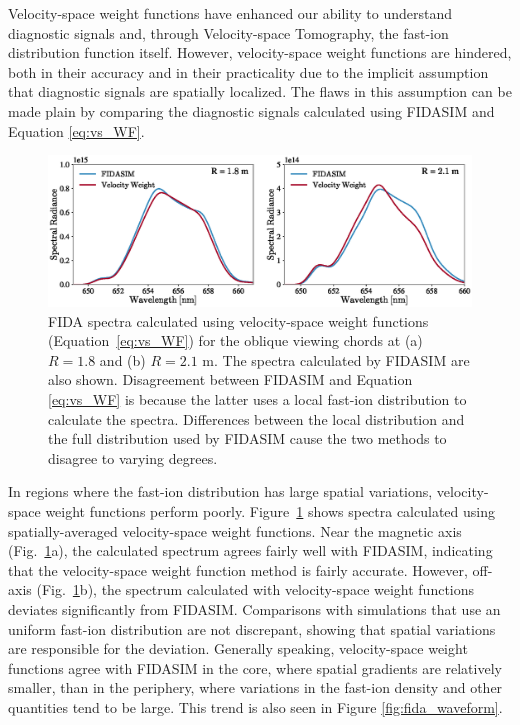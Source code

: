Velocity-space weight functions have enhanced our ability to understand diagnostic signals and, through Velocity-space Tomography, the fast-ion distribution function itself. However, velocity-space weight functions are hindered, both in their accuracy and in their practicality due to the implicit assumption that diagnostic signals are spatially localized. The flaws in this assumption can be made plain by comparing the diagnostic signals calculated using FIDASIM and Equation \ref{eq:vs_WF}.
\begin{figure}[h!]
    \centering
    \includegraphics[width=15cm]{figures/fida_spectra.eps}
    \caption{FIDA spectra calculated using velocity-space weight functions 
(Equation~\ref{eq:vs_WF}) for the oblique viewing chords at
(a) $R = 1.8$ and (b) $R = 2.1$ m.  The spectra calculated by FIDASIM are also shown.
 Disagreement between FIDASIM and Equation \ref{eq:vs_WF} is because the latter uses a local fast-ion distribution to calculate the spectra. Differences between the local distribution and the full distribution used by FIDASIM cause the two methods to disagree to varying degrees.}
    \label{fig:fida_spectra}
\end{figure}
In regions where the fast-ion distribution has large spatial variations, velocity-space weight functions perform poorly.
Figure~\ref{fig:fida_spectra} shows spectra calculated using spatially-averaged velocity-space
weight functions.  Near the magnetic axis (Fig.~\ref{fig:fida_spectra}a), the calculated
spectrum agrees fairly well with FIDASIM, indicating that the velocity-space weight function method is fairly accurate. However,
off-axis (Fig.~\ref{fig:fida_spectra}b), the spectrum calculated with
velocity-space weight functions deviates significantly from FIDASIM.  Comparisons with simulations that use an uniform fast-ion distribution are not discrepant, showing that spatial variations are responsible for the deviation.
Generally speaking, velocity-space weight functions agree with FIDASIM in the core, where spatial gradients are relatively smaller, than in the periphery, where variations in the fast-ion density and other quantities tend to be large.
This trend is also seen in Figure \ref{fig:fida_waveform}.

